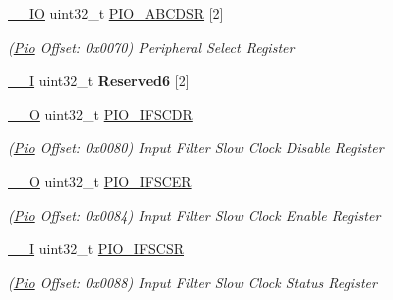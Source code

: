 \begin{DoxyCompactItemize}
\item 
\mbox{\label{structPio_a97db3c4989c1fa90db8a7c1ba1e8e285}} 
\mbox{\hyperlink{core__cm7_8h_aec43007d9998a0a0e01faede4133d6be}{\+\_\+\+\_\+\+IO}} uint32\+\_\+t \mbox{\hyperlink{structPio_a97db3c4989c1fa90db8a7c1ba1e8e285}{P\+I\+O\+\_\+\+A\+B\+C\+D\+SR}} \mbox{[}2\mbox{]}
\begin{DoxyCompactList}\small\item\em (\mbox{\hyperlink{structPio}{Pio}} Offset\+: 0x0070) Peripheral Select Register \end{DoxyCompactList}\item 
\mbox{\label{structPio_ae3cdd515ca04f485a8c0e1d8d03cd869}} 
\mbox{\hyperlink{core__cm7_8h_af63697ed9952cc71e1225efe205f6cd3}{\+\_\+\+\_\+I}} uint32\+\_\+t {\bfseries Reserved6} \mbox{[}2\mbox{]}
\item 
\mbox{\label{structPio_aa5d1f593484644bfe4dd0a68de66169a}} 
\mbox{\hyperlink{core__cm7_8h_a7e25d9380f9ef903923964322e71f2f6}{\+\_\+\+\_\+O}} uint32\+\_\+t \mbox{\hyperlink{structPio_aa5d1f593484644bfe4dd0a68de66169a}{P\+I\+O\+\_\+\+I\+F\+S\+C\+DR}}
\begin{DoxyCompactList}\small\item\em (\mbox{\hyperlink{structPio}{Pio}} Offset\+: 0x0080) Input Filter Slow Clock Disable Register \end{DoxyCompactList}\item 
\mbox{\label{structPio_aa591230ac3dfab8a00ff1d6609d5cae6}} 
\mbox{\hyperlink{core__cm7_8h_a7e25d9380f9ef903923964322e71f2f6}{\+\_\+\+\_\+O}} uint32\+\_\+t \mbox{\hyperlink{structPio_aa591230ac3dfab8a00ff1d6609d5cae6}{P\+I\+O\+\_\+\+I\+F\+S\+C\+ER}}
\begin{DoxyCompactList}\small\item\em (\mbox{\hyperlink{structPio}{Pio}} Offset\+: 0x0084) Input Filter Slow Clock Enable Register \end{DoxyCompactList}\item 
\mbox{\label{structPio_ab23b8cc26e3b5328857555107391a7f6}} 
\mbox{\hyperlink{core__cm7_8h_af63697ed9952cc71e1225efe205f6cd3}{\+\_\+\+\_\+I}} uint32\+\_\+t \mbox{\hyperlink{structPio_ab23b8cc26e3b5328857555107391a7f6}{P\+I\+O\+\_\+\+I\+F\+S\+C\+SR}}
\begin{DoxyCompactList}\small\item\em (\mbox{\hyperlink{structPio}{Pio}} Offset\+: 0x0088) Input Filter Slow Clock Status Register \end{DoxyCompactList}\item 

\end{DoxyCompactItemize}
